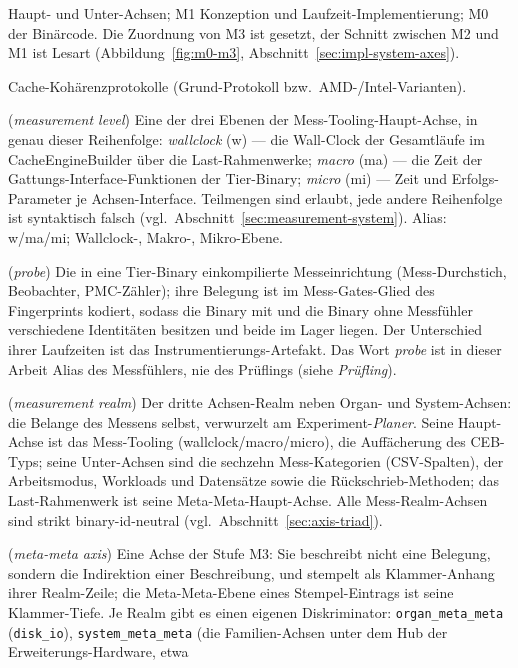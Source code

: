\begin{description}
  Haupt- und Unter-Achsen; M1 Konzeption und Laufzeit-Implementierung; M0 der Binärcode. Die
  Zuordnung von M3 ist gesetzt, der Schnitt zwischen M2 und M1 ist Lesart
  (Abbildung~\ref{fig:m0-m3}, Abschnitt~\ref{sec:impl-system-axes}).
  \item[MESI, MOESI, MESIF] Cache-Kohärenzprotokolle (Grund-Protokoll bzw.\ AMD-/Intel-Varianten).
  \item[Mess-Ebene] (\emph{measurement level}) Eine der drei Ebenen der Mess-Tooling-Haupt-Achse,
  in genau dieser Reihenfolge: \emph{wallclock} (w) --- die Wall-Clock der Gesamtläufe im
  CacheEngineBuilder über die Last-Rahmenwerke; \emph{macro} (ma) --- die Zeit der
  Gattungs-Interface-Funktionen der Tier-Binary; \emph{micro} (mi) --- Zeit und Erfolgs-Parameter je
  Achsen-Interface. Teilmengen sind erlaubt, jede andere Reihenfolge ist syntaktisch falsch
  (vgl.\ Abschnitt~\ref{sec:measurement-system}). Alias: w/ma/mi; Wallclock-, Makro-, Mikro-Ebene.
  \item[Messfühler] (\emph{probe}) Die in eine Tier-Binary einkompilierte Messeinrichtung
  (Mess-Durchstich, Beobachter, PMC-Zähler); ihre Belegung ist im Mess-Gates-Glied des Fingerprints
  kodiert, sodass die Binary mit und die Binary ohne Messfühler verschiedene Identitäten besitzen und
  beide im Lager liegen. Der Unterschied ihrer Laufzeiten ist das Instrumentierungs-Artefakt. Das Wort
  \emph{probe} ist in dieser Arbeit Alias des Messfühlers, nie des Prüflings (siehe \emph{Prüfling}).
  \item[Mess-Realm] (\emph{measurement realm}) Der dritte Achsen-Realm neben Organ- und
  System-Achsen: die Belange des Messens selbst, verwurzelt am Experiment-\emph{Planer}. Seine
  Haupt-Achse ist das Mess-Tooling (wallclock/macro/micro), die Auffächerung des CEB-Typs; seine
  Unter-Achsen sind die sechzehn Mess-Kategorien (CSV-Spalten), der Arbeitsmodus, Workloads und
  Datensätze sowie die Rückschrieb-Methoden; das Last-Rahmenwerk ist seine Meta-Meta-Haupt-Achse.
  Alle Mess-Realm-Achsen sind strikt binary-id-neutral (vgl.\ Abschnitt~\ref{sec:axis-triad}).
  \item[Meta-Meta-Achse] (\emph{meta-meta axis}) Eine Achse der Stufe M3: Sie beschreibt nicht
  eine Belegung, sondern die Indirektion einer Beschreibung, und stempelt als Klammer-Anhang ihrer
  Realm-Zeile; die Meta-Meta-Ebene eines Stempel-Eintrags ist seine Klammer-Tiefe. Je Realm gibt es
  einen eigenen Diskriminator: \texttt{organ\_meta\_meta} (\texttt{disk\_io}),
  \texttt{system\_meta\_meta} (die Familien-Achsen unter dem Hub der Erweiterungs-Hardware, etwa

\end{description}
